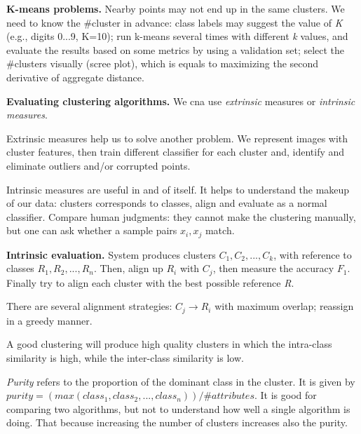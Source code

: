 \documentclass{article}
\begin{document}
\bigskip



\textbf{K-means problems. } Nearby points may not end up in the same clusters. We need to know the \#cluster in advance: class labels may suggest the value of \emph{K} (e.g., digits 0...9, K=10); run k-means several times with different \emph{k} values, and evaluate the results based on some metrics by using a validation set; select the \#clusters visually (scree plot), which is equals to maximizing the second derivative of aggregate distance.
\bigskip


\textbf{Evaluating clustering algorithms. } We cna use \emph{extrinsic} measures or \emph{intrinsic measures}.

Extrinsic measures help us to solve another problem. We represent images with cluster features, then train different classifier for each cluster and, identify and eliminate outliers and/or corrupted points.

Intrinsic measures are useful in and of itself. It helps to understand the makeup of our data: clusters corresponds to classes, align and evaluate as a normal classifier. Compare human judgments: they cannot make the clustering manually, but one can ask whether a sample pairs \(x_i, x_j\) match.


\bigskip

\textbf{Intrinsic evaluation. } System produces clusters \(C_1, C_2, ..., C_k\), with reference to classes \(R_1, R_2, ..., R_n\). Then, align up \(R_i\) with \(C_j\), then measure the accuracy \(F_1\). Finally try to align each cluster with the best possible reference \emph{R}.

There are several alignment strategies: \(C_j \rightarrow R_i\) with maximum overlap; reassign in a greedy manner. 

\bigskip

A good clustering will produce high quality clusters in which the intra-class similarity is high, while the inter-class similarity is low.

\emph{Purity}  refers to the proportion of the dominant class in the cluster. It is given by \(purity = (max(class_1, class_2, ..., class_n)) / \#attributes\). It is good for comparing two algorithms, but not to understand how well a single algorithm is doing. That because increasing the number of clusters increases also the purity.






	
	
	
	
	
	
	
	
	
	
	
	
	
\end{document}
